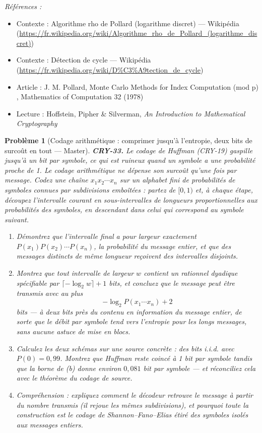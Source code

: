 \documentclass[11pt]{article}
\newtheorem{problem}{Problème}
\newenvironment{refs}{\par\small\noindent\emph{Références :}\begin{itemize}\setlength\itemsep{0pt}}{\end{itemize}\normalsize}
\begin{document}
\begin{refs}
\item Contexte : Algorithme rho de Pollard (logarithme discret) --- Wikipédia (\url{https://fr.wikipedia.org/wiki/Algorithme_rho_de_Pollard_(logarithme_discret)})
\item Contexte : Détection de cycle --- Wikipédia (\url{https://fr.wikipedia.org/wiki/D%C3%A9tection_de_cycle})
\item Article : J. M. Pollard, \og{} Monte Carlo Methods for Index Computation (mod p) \fg{}, Mathematics of Computation 32 (1978)
\item Lecture : Hoffstein, Pipher \& Silverman, \textit{An Introduction to Mathematical Cryptography}
\end{refs}

\bigskip

\begin{problem}[{Codage arithmétique : comprimer jusqu'à l'entropie, deux bits de surcoût en tout --- Master}]
\textbf{CRY-33.} Le codage de Huffman (CRY-19) gaspille jusqu'à un bit \textit{par symbole},
ce qui est ruineux quand un symbole a une probabilité proche de 1. Le codage arithmétique ne
dépense son surcoût qu'une fois par \textit{message}. Codez une chaîne $x_1 x_2 \cdots x_n$
sur un alphabet fini de probabilités de symboles connues par subdivisions emboîtées : partez
de $[0,1)$ et, à chaque étape, découpez l'intervalle courant en sous-intervalles de
longueurs proportionnelles aux probabilités des symboles, en descendant dans celui qui
correspond au symbole suivant.
\begin{enumerate}
\item[(a)] Démontrez que l'intervalle final a pour largeur exactement
$P(x_1)P(x_2)\cdots P(x_n)$, la probabilité du message entier, et que des messages
distincts de même longueur reçoivent des intervalles disjoints.
\item[(b)] Montrez que tout intervalle de largeur $w$ contient un rationnel dyadique spécifiable
par $\lceil -\log_2 w \rceil + 1$ bits, et concluez que le message peut être transmis avec
au plus
\[ -\log_2 P(x_1 \cdots x_n) + 2 \]
bits --- à deux bits près du contenu en information du message entier, de sorte que le débit
par symbole tend vers l'entropie pour les longs messages, sans aucune astuce de mise en
blocs.
\item[(c)] Calculez les deux schémas sur une source concrète : des bits i.i.d. avec
$P(0) = 0{,}99$. Montrez que Huffman reste coincé à 1 bit par symbole tandis que la borne de
(b) donne environ $0{,}081$ bit par symbole --- et réconciliez cela avec le théorème du codage
de source.
\item[(d)] Compréhension : expliquez comment le décodeur retrouve le message à partir du
nombre transmis (il rejoue les mêmes subdivisions), et pourquoi toute la construction est le
codage de Shannon--Fano--Elias étiré des symboles isolés aux messages entiers.
\end{enumerate}

\end{problem}
\end{document}
